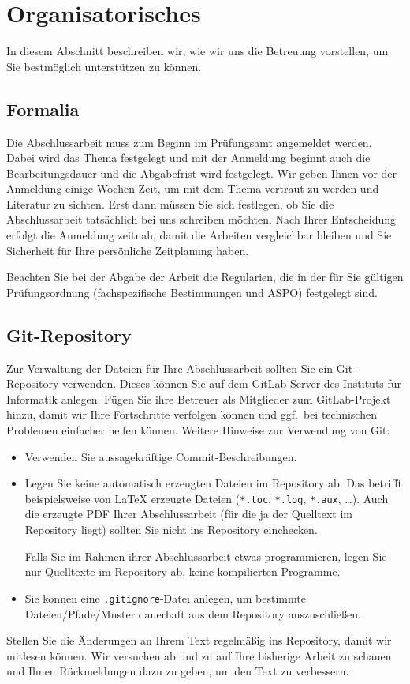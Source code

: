 \documentclass[bachelor,german]{info1thesis}
\begin{document}
\chapter{Organisatorisches}
\label{appendix:orga}

In diesem Abschnitt beschreiben wir, wie wir uns die Betreuung vorstellen, um
Sie bestmöglich unterstützen zu können.

\section{Formalia}
Die Abschlussarbeit muss zum Beginn im Prüfungsamt angemeldet werden.
Dabei wird das Thema festgelegt und mit der Anmeldung beginnt auch die
Bearbeitungsdauer und die Abgabefrist wird festgelegt.
Wir geben Ihnen vor der Anmeldung einige Wochen Zeit, um mit dem Thema vertraut
zu werden und Literatur zu sichten.
Erst dann müssen Sie sich festlegen, ob Sie die Abschlussarbeit tatsächlich bei
uns schreiben möchten.
Nach Ihrer Entscheidung erfolgt die Anmeldung zeitnah, damit die Arbeiten 
vergleichbar bleiben und Sie Sicherheit für Ihre persönliche Zeitplanung 
haben. 

Beachten Sie bei der Abgabe der Arbeit die Regularien, die in der für Sie
gültigen Prüfungsordnung (fachspezifische Bestimmungen und ASPO) festgelegt
sind.


\section{Git-Repository}
Zur Verwaltung der Dateien für Ihre Abschlussarbeit sollten Sie ein
Git-Repository verwenden.
Dieses können Sie auf dem GitLab-Server des Instituts für Informatik anlegen.
Fügen Sie ihre Betreuer als Mitglieder zum GitLab-Projekt hinzu, damit wir Ihre
Fortschritte verfolgen können und ggf.\ bei technischen Problemen einfacher
helfen können.
Weitere Hinweise zur Verwendung von Git:
\begin{itemize}
    \item Verwenden Sie aussagekräftige Commit-Beschreibungen.

    \item Legen Sie keine automatisch erzeugten Dateien im Repository ab.
        Das betrifft beispielsweise von LaTeX erzeugte Dateien (\texttt{*.toc},
        \texttt{*.log}, \texttt{*.aux}, \dots).
        Auch die erzeugte PDF Ihrer Abschlussarbeit (für die ja der Quelltext
        im Repository liegt) sollten Sie nicht ins Repository einchecken.

        Falls Sie im Rahmen ihrer Abschlussarbeit etwas programmieren, legen
        Sie nur Quelltexte im Repository ab, keine kompilierten Programme.

    \item Sie können eine \texttt{.gitignore}-Datei anlegen, um bestimmte
        Dateien/Pfade/Muster dauerhaft aus dem Repository auszuschließen.
\end{itemize}
Stellen Sie die Änderungen an Ihrem Text regelmäßig ins Repository, damit wir
mitlesen können.
Wir versuchen ab und zu auf Ihre bisherige Arbeit zu schauen und Ihnen
Rückmeldungen dazu zu geben, um den Text zu verbessern.
\end{document}
